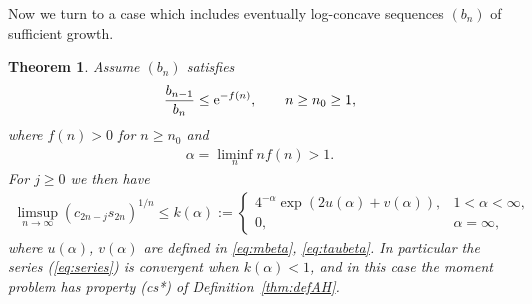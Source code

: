 \documentclass[pdftex]{sigma}
\numberwithin{equation}{section}
\newtheorem{thm}{Theorem}[section]
\begin{document}
Now we turn to a case which includes eventually log-concave sequences $(b_n)$ of sufficient growth.

\begin{thm}\label{thm:evtlogconcave} Assume $(b_n)$ satisfies
\begin{gather*}
{b_{n-1}\over b_{n}} \le {\rm e}^{-f(n)}, \qquad n\ge n_0\ge 1,
\end{gather*}
 where $f(n)>0$ for $n\ge n_0$ and
 \begin{gather*}
\alpha=\liminf_{n} nf(n)>1.
\end{gather*}
For $j\ge 0$ we then have
\begin{gather*}
\limsup_{n\to\infty}(c_{2n-j}s_{2n})^{1/n} \le
 k(\alpha):= \begin{cases} 4^{-\alpha}\exp(2u(\alpha)+v(\alpha)), & 1<\alpha <\infty,\\
0, & \alpha=\infty,
\end{cases}
\end{gather*}
where $u(\alpha)$, $v(\alpha)$ are defined in \eqref{eq:mbeta}, \eqref{eq:taubeta}. In particular the series {\rm (\ref{eq:series})} is convergent when $k(\alpha)<1$, and in this case the moment problem has property {\rm (cs*)} of Definition~{\rm \ref{thm:defAH}}.
\end{thm}
\end{document}
